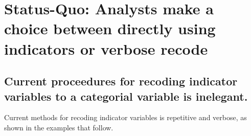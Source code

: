 \hypertarget{status-quo-analysts-make-a-choice-between-directly-using-indicators-or-verbose-recode}{%
\section{Status-Quo: Analysts make a choice between directly using
indicators or verbose
recode}\label{status-quo-analysts-make-a-choice-between-directly-using-indicators-or-verbose-recode}}

\hypertarget{current-proceedures-for-recoding-indicator-variables-to-a-categorial-variable-is-inelegant.}{%
\subsection{Current proceedures for recoding indicator variables to a
categorial variable is
inelegant.}\label{current-proceedures-for-recoding-indicator-variables-to-a-categorial-variable-is-inelegant.}}

Current methods for recoding indicator variables is repetitive and
verbose, as shown in the examples that follow.


